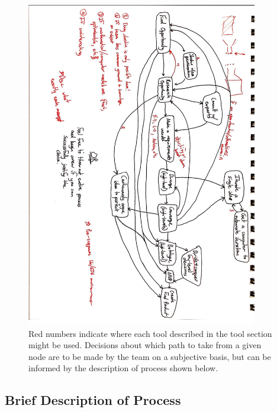 \documentclass[a4paper,12pt]{article}
\begin{document}
\begin{figure}[H]
\centering
\includegraphics[width=0.9\textwidth]{img/image023.png}
\caption{Red numbers indicate where each tool described in the tool section might be used. Decisions about which path to take from a given node are to be made by the team on a subjective basis, but can be informed by the description of process shown below.}
\label{}
\end{figure}

\subsection{Brief Description of Process}
\end{document}
